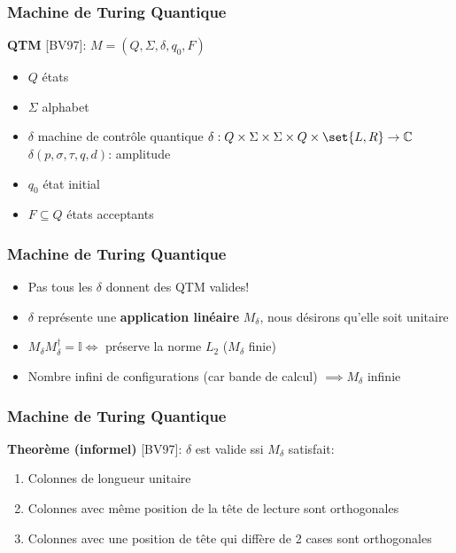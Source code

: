 \documentclass{beamer}
\begin{document}
\begin{frame}
  \frametitle{Machine de Turing Quantique}

  \textbf{QTM} [BV97]: $M = (Q, \Sigma, \delta, q_0, F)$
  \begin{itemize}
    \item $Q$ \'etats
    \item $\Sigma$ alphabet
    \item $\delta$ machine de contr\^ole quantique $\delta: Q \times \Sigma \times \Sigma \times Q \times \set{L, R} \rightarrow \mathbb{C}$\\
          $\delta(p,\sigma,\tau,q,d)$: amplitude
    \item $q_0$ \'etat initial
    \item $F \subseteq Q$ \'etats acceptants
  \end{itemize}
\end{frame}

\begin{frame}
  \frametitle{Machine de Turing Quantique}

  \begin{itemize}
    \item Pas tous les $\delta$ donnent des QTM valides! \pause
    \item $\delta$ repr\'esente une \textbf{application lin\'eaire} $M_\delta$, nous d\'esirons qu'elle soit \alert{unitaire} \pause
    \item $M_\delta M_\delta^\dag = \mathbb{I} \iff$ pr\'eserve la norme $L_2$ ($M_\delta$ finie) \pause
    \item Nombre \alert{infini} de configurations (car bande de calcul) $\implies M_\delta$ infinie
  \end{itemize}
\end{frame}

\begin{frame}
  \frametitle{Machine de Turing Quantique}

  \textbf{Theor\`eme (informel)} [BV97]: $\delta$ est valide ssi $M_\delta$ satisfait:
  \begin{enumerate}
    \item Colonnes de longueur unitaire
    \item Colonnes avec m\^eme position de la t\^ete de lecture sont orthogonales
    \item Colonnes avec une position de t\^ete qui diff\`ere de 2 cases sont orthogonales
  \end{enumerate}
\end{frame}
\end{document}
